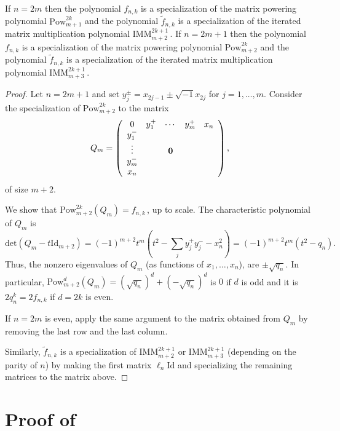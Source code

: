 \documentclass{toc}
\newcommand{\vvirg}{ , \dots , }
\newcommand{\textsum}{{\textstyle \sum}}
\renewcommand{\tilde}[1]{\widetilde{#1}}
\newcommand{\Id}{\mathrm{Id}}
\newcommand{\Pow}{\mathrm{Pow}}
\renewcommand{\det}{\mathrm{det}}
\newcommand{\IMM}{\mathrm{IMM}}
\begin{document}
%
%
%

%
%
%
%
%
%
%
%

\begin{proposition}\label{prop: IMM specializes to fnk}
If $n = 2m$ then the polynomial $f_{n,k}$ is a specialization of
the matrix powering polynomial $\Pow^{2k}_{m+1}$ 
and the polynomial $\tilde{f}_{n,k}$ 
is a specialization of the iterated matrix multiplication
polynomial $\IMM^{2k+1}_{m+2}$\,.
If $n = 2m+1$ then the polynomial $f_{n,k}$ is a specialization of
the matrix powering polynomial $\Pow^{2k}_{m+2}$
and the polynomial $\tilde{f}_{n,k}$
is a specialization of the iterated matrix multiplication
polynomial $\IMM^{2k+1}_{m+3}$\,.
\end{proposition}
%
%
%
%
%
%
%
%
\begin{proof}
Let $n = 2m+1$ and set $y_j^\pm = x_{2j-1} \pm \sqrt{-1} x_{2j}$ for $j = 1 \vvirg m$. Consider the specialization of $\Pow^{2k}_{m+2}$ to the matrix
\[
 Q_m = \left( \begin{array}{ccccc}
  0 & y_1^+ & \cdots & y_m^+ & x_n \\
  y_1^- & & & & \\
  \vdots &  &\bf0 & &\\
  y_m^- & & & & \\
  x_n & & & & 
 \end{array}\right),
\]
of size $m+2$.

We show that $\Pow^{2k}_{m+2}(Q_m) = f_{n,k}$\,, up to scale. The characteristic polynomial of $Q_m$ is
\[
 \det(Q_m - t\Id_{m+2}) = (-1)^{m+2} t^{m}\left( t^2 - \textsum_j y_j^+ y_j^- - x_n^2\right) = (-1)^{m+2} t^{m}\left( t^2 - q_n\right).
\]
Thus, the nonzero eigenvalues of $Q_m$ (as functions of $x_1\vvirg x_n$),  are $\pm \sqrt{q_n}$. In particular, $\Pow^{d}_{m+2}(Q_m) = (\sqrt{q_n})^d + (-\sqrt{q_n})^d$ is $0$ if $d$ is odd and it is $2 q_n^k = 2f_{n,k}$ if $d = 2k$ is even.

If $n = 2m$ is even, apply the same argument to the matrix obtained from $Q_m$ by removing the last row and the last column.

Similarly, $\tilde f_{n,k}$ is a specialization of $\IMM^{2k+1}_{m+2}$ or $\IMM^{2k+1}_{m+3}$ (depending on the parity of $n$) by making the first matrix $\ell_n\Id$ and specializing the remaining matrices to the matrix above.
\end{proof}


\section{Proof of }
\end{document}
